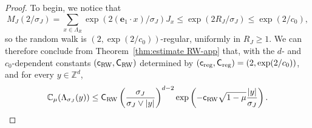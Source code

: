 \documentclass[11pt,a4paper]{article}
\numberwithin{equation}{section}
\theoremstyle{plain}
\theoremstyle{definition}
\newcommand\1{\mathds{1}}
\newcommand\Crw{\mathsf{C}_{\textup{RW}}}
\newcommand\crw{\mathsf{c}_{\textup{RW}}}
\newcommand\creg{\mathsf{c}_{\textup{reg}}}
\newcommand\Creg{\mathsf{C}_{\textup{reg}}}
\begin{document}
\begin{proof}
To begin, we notice that
\begin{equation}\label{eq:gfestimate1new}
	M_J(2/\sigma_J)
    =
    \sum_{x\in \Lambda_R}\exp(2(\mathbf{e}_1\cdot x )/\sigma_J)J_x
    \leq
    \exp(2R_J/\sigma_J)\leq \exp(2/c_0),
\end{equation}
so the random walk is $(2,\exp(2/c_0))$-regular, uniformly in $R_J\geq 1$.
We can therefore conclude from Theorem~\ref{thm:estimate RW-app} that,
with the $d$- and $c_0$-dependent
constants $(\crw,\Crw)$ determined by $(\creg,\Creg)=(2,\exp(2/c_0))$,
and for every $y\in\mathbb Z^d$,
\begin{equation}\label{eq:gfestimate3new}
	\mathbb C_\mu(\Lambda_{\sigma_J}(y))
    \leq \Crw\left(\frac{\sigma_J}{\sigma_J\vee |y|}\right)^{d-2}
    \exp\left(-\crw\sqrt{1-\mu}\frac{|y|}{\sigma_J}\right).
\end{equation}


\end{proof}
\end{document}
